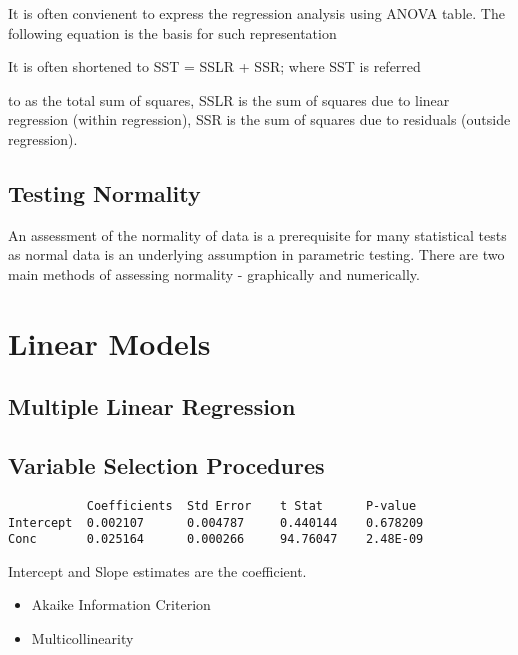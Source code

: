 It is often convienent to express the regression analysis using
ANOVA table. The following equation is the basis for such
representation

It is often shortened to SST = SSLR + SSR; where SST is referred

to as the total sum of squares, SSLR is the sum of squares due to
linear regression (within regression), SSR is the sum of squares
due to residuals (outside regression).




\section{Testing Normality}
An assessment of the normality of data is a prerequisite for many statistical tests as normal data is an underlying assumption in parametric testing. There are two main methods of assessing normality - graphically and numerically.


\chapter{Linear Models}
\section{Multiple Linear Regression}
\section{Variable Selection Procedures}

\begin{verbatim}
           Coefficients  Std Error    t Stat      P-value
Intercept  0.002107      0.004787     0.440144    0.678209
Conc       0.025164      0.000266     94.76047    2.48E-09
\end{verbatim}

Intercept and Slope estimates are the coefficient.

\begin{itemize}
\item Akaike Information Criterion
\item Multicollinearity
\end{itemize}

